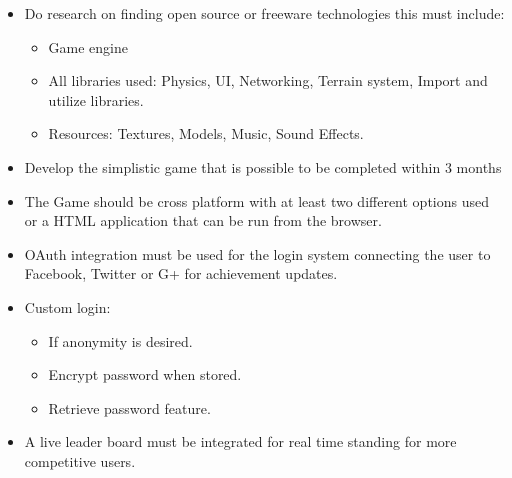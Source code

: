 \documentclass[letterpaper]{article}
\begin{document}
		\begin{itemize}
			\item Do research on finding open source or freeware technologies this must include:
				\begin{itemize}
					\item	Game engine
					\item	All libraries used: Physics, UI, Networking, Terrain system, Import and utilize libraries.
					\item	Resources: Textures, Models, Music, Sound Effects.
				\end{itemize}
			\item	Develop the simplistic game that is possible to be completed within 3 months
			\item	The Game should be cross platform with at least two different options used or a HTML application that can be run from the browser.
			\item	OAuth integration must be used for the login system connecting the user to Facebook, Twitter or G+ for achievement updates.
			\item	Custom login: 
				\begin{itemize}
					\item	If anonymity is desired.
					\item	Encrypt password when stored.
					\item	Retrieve password feature.
				\end{itemize}
			\item	A live leader board must be integrated for real time standing for more competitive users.
		\end{itemize}
		
		\vspace{0.2in}
		
		\section*{\colorbox{blue}{}} 
		
		\vspace{0.2in}
		
\end{document}
